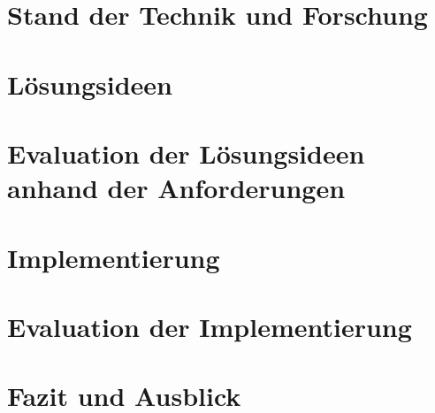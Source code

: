 \documentclass[11pt,twoside,a4paper,titlepage]{article}
\begin{document}
\section{Stand der Technik und Forschung}

\section{Lösungsideen}

\section{Evaluation der Lösungsideen anhand der Anforderungen} 

\section{Implementierung}

\section{Evaluation der Implementierung}

\section{Fazit und Ausblick}






%
%
{}
\end{document}
